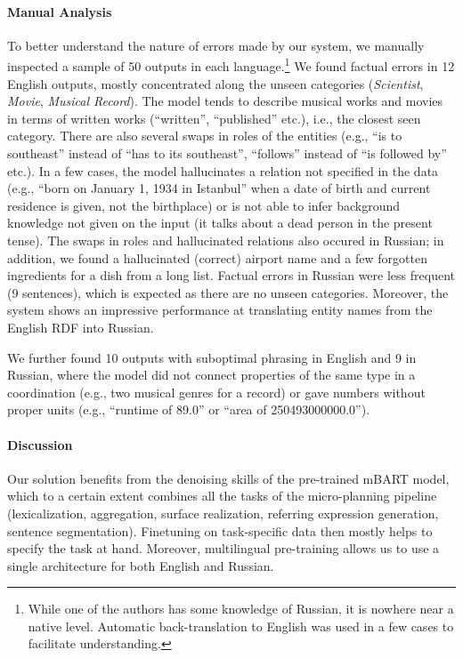\paragraph{Manual Analysis}
To better understand the nature of errors made by our system, we manually inspected a sample of 50 outputs in each language.\footnote{While one of the authors has some knowledge of Russian, it is nowhere near a native level. Automatic back-translation to English was used in a few cases to facilitate understanding.} We found factual errors in 12 English outputs, mostly concentrated along the unseen categories (\emph{Scientist}, \emph{Movie}, \emph{Musical Record}). The model tends to describe musical works and movies in terms of written works (“written”, “published” etc.), i.e., the closest seen category. There are also several swaps in roles of the entities (e.g., “is to southeast” instead of “has to its southeast”, “follows” instead of “is followed by” etc.). In a few cases, the model hallucinates a relation not specified in the data (e.g., “born on January 1, 1934 in Istanbul” when a date of birth and current residence is given, not the birthplace) or is not able to infer background knowledge not given on the input (it talks about a dead person in the present tense).
The swaps in roles and hallucinated relations also occured in Russian; in addition, we found a hallucinated (correct) airport name and a few forgotten ingredients for a dish from a long list. Factual errors in Russian were less frequent (9 sentences), which is expected as there are no unseen categories. Moreover, the system shows an impressive performance at translating entity names from the English RDF into Russian.

We further found 10 outputs with suboptimal phrasing in English and 9 in Russian, where the model did not connect properties of the same type in a coordination (e.g., two musical genres for a record) or gave numbers without proper  units (e.g., “runtime of 89.0” or “area of 250493000000.0”).

\paragraph{Discussion}
Our solution benefits from the denoising skills of the pre-trained mBART model, which to a certain extent combines all the tasks of the micro-planning pipeline (lexicalization, aggregation, surface realization, referring expression generation, sentence segmentation). Finetuning on task-specific data then mostly helps to specify the task at hand. Moreover, multilingual pre-training allows us to use a single architecture for both English and Russian.

